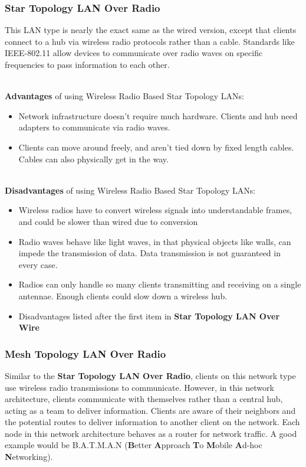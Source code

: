 	\subsubsection{Star Topology LAN Over Radio}
	This LAN type is nearly the exact same as the wired version, except that clients connect to a hub via wireless radio protocols rather than a cable.
	Standards like IEEE-802.11 allow devices to communicate over radio waves on specific frequencies to pass information to each other.\cite{LAN3}

	\noindent \\ \textbf{Advantages} of using Wireless Radio Based Star Topology LANs:
	\begin{itemize}
		\item Network infrastructure doesn't require much hardware.  Clients and hub need adapters to communicate via radio waves.
		\item Clients can move around freely, and aren't tied down by fixed length cables.  Cables can also physically get in the way.
	\end{itemize}

	\noindent \\ \textbf{Disadvantages} of using Wireless Radio Based Star Topology LANs:
	\begin{itemize}
		\item Wireless radios have to convert wireless signals into understandable frames, and could be slower than wired due to conversion
		\item Radio waves behave like light waves, in that physical objects like walls, can impede the transmission of data.  Data transmission is not guaranteed in every case.
		\item Radios can only handle so many clients transmitting and receiving on a single antennae. Enough clients could slow down a wireless hub.
		\item Disadvantages listed after the first item in \textbf{Star Topology LAN Over Wire}
	\end{itemize}


	\subsubsection{Mesh Topology LAN Over Radio}
	Similar to the \textbf{Star Topology LAN Over Radio}, clients on this network type use wireless radio transmissions to communicate.
	However, in this network architecture, clients communicate with themselves rather than a central hub, acting as a team to deliver information.
	Clients are aware of their neighbors and the potential routes to deliver information to another client on the network.
	Each node in this network architecture behaves as a router for network traffic.
	A good example would be B.A.T.M.A.N (\textbf{B}etter \textbf{A}pproach \textbf{T}o \textbf{M}obile \textbf{A}d-hoc \textbf{N}etworking).  \cite{LAN4}

